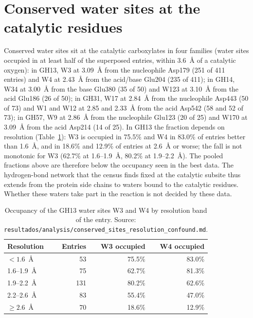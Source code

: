 \documentclass[preprint,12pt]{elsarticle}
\begin{document}
\section{Conserved water sites at the catalytic residues}
Conserved water sites sit at the catalytic carboxylates in four
families (water sites occupied in at least half of the superposed entries, within
3.6~\AA{} of a catalytic oxygen): in GH13, W3 at 3.09~\AA{} from the nucleophile Asp179
(251 of 411 entries) and W4 at 2.43~\AA{} from the acid/base Glu204 (235 of 411); in GH14,
W34 at 3.00~\AA{} from the base Glu380 (35 of 50) and W123 at 3.10~\AA{} from the acid
Glu186 (26 of 50); in GH31, W17 at 2.84~\AA{} from the nucleophile Asp443 (50 of 73) and W1
and W12 at 2.85 and 2.33~\AA{} from the acid Asp542 (58 and 52 of 73); in GH57, W9 at
2.86~\AA{} from the nucleophile Glu123 (20 of 25) and W170 at 3.09~\AA{} from the acid Asp214
(14 of 25). In GH13 the fraction depends on resolution (Table~\ref{tab:sires}): W3 is occupied in
75.5\% and W4 in 83.0\% of entries better than 1.6~\AA, and in 18.6\% and 12.9\% of entries
at 2.6~\AA{} or worse; the fall is not monotonic for W3 (62.7\% at 1.6--1.9~\AA, 80.2\% at
1.9--2.2~\AA). The pooled fractions above are therefore below the occupancy seen in the best
data. The hydrogen-bond network that the census finds
fixed at the catalytic subsite thus extends from the protein side chains to waters bound to
the catalytic residues. Whether these waters take part in the reaction is not decided by
these data.

\begin{table}[h]
\centering\small
\caption{Occupancy of the GH13 water sites W3 and W4 by resolution band of the entry.
Source: \texttt{resultados/analysis/conserved\_sites\_resolution\_confound.md}.}
\label{tab:sires}
\begin{tabular}{lrrr}
\toprule
Resolution & Entries & W3 occupied & W4 occupied\\
\midrule
$<1.6$~\AA & 53 & 75.5\% & 83.0\%\\
1.6--1.9~\AA & 75 & 62.7\% & 81.3\%\\
1.9--2.2~\AA & 131 & 80.2\% & 62.6\%\\
2.2--2.6~\AA & 83 & 55.4\% & 47.0\%\\
$\ge2.6$~\AA & 70 & 18.6\% & 12.9\%\\
\bottomrule
\end{tabular}
\end{table}
\end{document}
